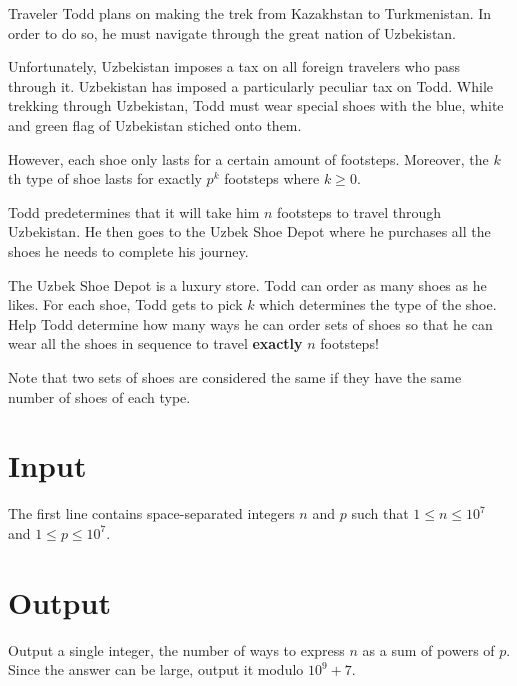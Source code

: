 
Traveler Todd plans on making the trek from Kazakhstan to Turkmenistan.
In order to do so, he must navigate through the great nation of Uzbekistan.

\medskip

Unfortunately, Uzbekistan imposes a tax on all foreign travelers who pass
through it. Uzbekistan has imposed a particularly peculiar tax on Todd.
While trekking through Uzbekistan, Todd must wear special shoes with the
blue, white and green flag of Uzbekistan stiched onto them.

\medskip

However, each shoe only lasts for a certain amount of footsteps. Moreover,
the $k$th type of shoe lasts for exactly $p^k$ footsteps where $k \ge 0$.

\medskip

Todd predetermines that it will take him $n$ footsteps to travel through
Uzbekistan. He then goes to the Uzbek Shoe Depot where he purchases all
the shoes he needs to complete his journey.

\medskip

The Uzbek Shoe Depot is a luxury store. Todd can order as many shoes as he
likes. For each shoe, Todd gets to pick $k$ which determines the type 
of the shoe. Help Todd determine how many ways he can order sets of shoes so
that he can wear all the shoes in sequence to travel \textbf{exactly} $n$
footsteps!

\medskip

Note that two sets of shoes are considered the same if they have the same
number of shoes of each type.

\section*{Input}
The first line contains space-separated integers $n$ and $p$ such that
$1 \leq n \leq 10^7$ and $1 \leq p \leq 10^7$.

\section*{Output}
Output a single integer, the number of ways to express $n$ as a sum of
powers of $p$. Since the answer can be large, output it modulo $10^9 + 7$.
